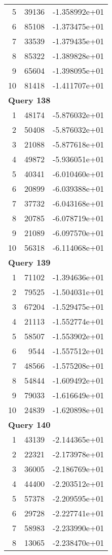 \begin{longtable}[{p}]{@{}rrp{}@{}}
5 & 39136 & -1.358992e+01 \\
6 & 85108 & -1.373475e+01 \\
7 & 33539 & -1.379435e+01 \\
8 & 85322 & -1.389828e+01 \\
9 & 65604 & -1.398095e+01 \\
10 & 81418 & -1.411707e+01 \\
\midrule
\multicolumn{3}{l}{\bfseries Query 138} \\
1 & 48174 & -5.876032e+01 \\
2 & 50408 & -5.876032e+01 \\
3 & 21088 & -5.877618e+01 \\
4 & 49872 & -5.936051e+01 \\
5 & 40341 & -6.010460e+01 \\
6 & 20899 & -6.039388e+01 \\
7 & 37732 & -6.043168e+01 \\
8 & 20785 & -6.078719e+01 \\
9 & 21089 & -6.097570e+01 \\
10 & 56318 & -6.114068e+01 \\
\midrule
\multicolumn{3}{l}{\bfseries Query 139} \\
1 & 71102 & -1.394636e+01 \\
2 & 79525 & -1.504031e+01 \\
3 & 67204 & -1.529475e+01 \\
4 & 21113 & -1.552774e+01 \\
5 & 58507 & -1.553902e+01 \\
6 & 9544 & -1.557512e+01 \\
7 & 48566 & -1.575208e+01 \\
8 & 54844 & -1.609492e+01 \\
9 & 79033 & -1.616649e+01 \\
10 & 24839 & -1.620898e+01 \\
\midrule
\multicolumn{3}{l}{\bfseries Query 140} \\
1 & 43139 & -2.144365e+01 \\
2 & 22321 & -2.173978e+01 \\
3 & 36005 & -2.186769e+01 \\
4 & 44400 & -2.203512e+01 \\
5 & 57378 & -2.209595e+01 \\
6 & 29728 & -2.227741e+01 \\
7 & 58983 & -2.233990e+01 \\
8 & 13065 & -2.238470e+01 \\

\end{longtable}
